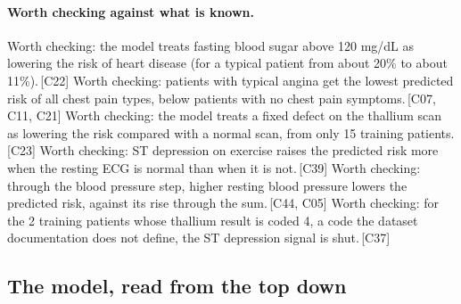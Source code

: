 \documentclass[a4paper,10pt]{article}
\newif\ifreviewmarks
\newcommand{\reviewrule}{\noindent{\color{BrickRed}\rule{\linewidth}{0.8pt}}}
\newenvironment{drafted}[1][]{%
  \ifreviewmarks\par\addvspace{\medskipamount}\reviewrule\par\nopagebreak
  \noindent{\color{BrickRed}\sffamily\footnotesize\textbf{Thesis Draft}\quad #1\hfill review}\par\nopagebreak\smallskip\fi}{%
  \ifreviewmarks\par\smallskip\noindent{\color{BrickRed}\sffamily\footnotesize end of thesis draft}\par\nopagebreak\reviewrule\par\medskip\fi}
\begin{document}
\begin{drafted}[plain-language layer: heart-s5-c2]
\paragraph{Worth checking against what is known.} Worth checking: the model treats fasting blood sugar above 120 mg/dL as lowering the risk of heart disease (for a typical patient from about 20\% to about 11\%).\,{\scriptsize\textcolor{NavyBlue}{[C22]}} Worth checking: patients with typical angina get the lowest predicted risk of all chest pain types, below patients with no chest pain symptoms.\,{\scriptsize\textcolor{NavyBlue}{[C07, C11, C21]}} Worth checking: the model treats a fixed defect on the thallium scan as lowering the risk compared with a normal scan, from only 15 training patients.\,{\scriptsize\textcolor{NavyBlue}{[C23]}} Worth checking: ST depression on exercise raises the predicted risk more when the resting ECG is normal than when it is not.\,{\scriptsize\textcolor{NavyBlue}{[C39]}} Worth checking: through the blood pressure step, higher resting blood pressure lowers the predicted risk, against its rise through the sum.\,{\scriptsize\textcolor{NavyBlue}{[C44, C05]}} Worth checking: for the 2 training patients whose thallium result is coded 4, a code the dataset documentation does not define, the ST depression signal is shut.\,{\scriptsize\textcolor{NavyBlue}{[C37]}}
\subsection{The model, read from the top down}

\end{drafted}
\end{document}
